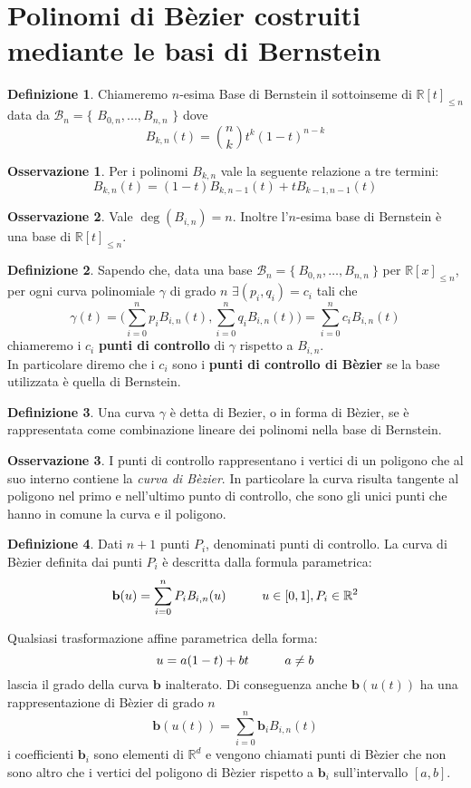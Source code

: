 \documentclass[a4paper,12pt]{report}
\newcommand\tab[1][0.5cm]{\hspace*{#1}}
\theoremstyle{definition}
\newtheorem{defin}{Definizione}[chapter]
\newtheorem{oss}{Osservazione}[chapter]
\newcommand{\numberset}{\mathbb}
\newcommand{\R}{{\numberset{R}}}
\begin{document}
\section{Polinomi di Bèzier costruiti mediante le basi di Bernstein}
\begin{defin}
	Chiameremo $n$-esima Base di Bernstein il sottoinseme di $\R[t]_{\le n}$ data da $\mathcal{{B}}_n = \{$ $\mathbb{\textit{B}}_{0,n} , ... , \mathbb{\textit{B}}_{n,n} $ $\}$ dove 
	$$B_{k,n}(t) =  \binom{n}{k} t^k (1-t)^{n-k}$$
\end{defin}
\begin{oss}
	Per i polinomi $B_{k,n}$ vale la seguente relazione a tre termini:$$B_{k,n}(t) = (1-t)B_{k,n-1}(t) + tB_{k-1,n-1}(t)$$
\end{oss}
\begin{oss}\label{Base}
	Vale $\deg(\mathbb{\textit{B}}_{i,n}) = n $. Inoltre l'$n$-esima base di Bernstein è una base di $\mathbb{R}[t]_{\leq n}$.
\end{oss}
\begin{defin}
	Sapendo che, data una base $\mathcal{B}_n=\{\ B_{0,n},\ldots,B_{n,n}\ \}$ per $\mathbb{R}[x]_{\le n}$, per ogni curva polinomiale $\gamma$ di grado $n$ $\exists (p_i,q_i) = c_i$ tali che $$\gamma(t) = \big(\sum_{i=0}^{n} p_i\mathbb{\textit{B}}_{i,n}(t) , \sum_{i=0}^{n} q_i\mathbb{\textit{B}}_{i,n}(t) \big) = \sum_{i=0}^{n} c_i\mathbb{\textit{B}}_{i,n}(t)$$chiameremo i $c_i$ \textbf{punti di controllo} di $\gamma$ rispetto a $\mathbb{\textit{B}}_{i,n}.$\\
	In particolare diremo che i $c_i$ sono i \textbf{punti di controllo di Bèzier} se la base utilizzata è quella di Bernstein.
\end{defin}
\begin{defin} Una curva $\gamma$ è detta di Bezier, o in forma di Bèzier, se è rappresentata come combinazione lineare dei polinomi nella base di Bernstein.
\end{defin}
\begin{oss}
	I punti di controllo rappresentano i vertici di un poligono che al suo interno contiene la \textit{curva di Bèzier}. In particolare la curva risulta tangente al poligono nel primo e nell'ultimo punto di controllo, che sono gli unici punti che hanno in comune la curva e il poligono.
\end{oss}
\begin{defin}
	Dati $n+1$ punti $P_i$, denominati punti di controllo. La curva di Bèzier definita dai punti $P_i$ è descritta dalla formula parametrica: $$\textbf{b}(u) = \sum_{i=0}^{n} P_i\mathbb{\textit{B}}_{i,n}(u) \tab \tab u \in [0,1] ,  P_i \in \mathbb{R}^2$$ 
\end{defin}
Qualsiasi trasformazione affine parametrica della forma: $$u = a(1-t) + bt \tab \tab a \neq b$$
lascia il grado della curva $\textbf{b}$ inalterato. Di conseguenza anche $\textbf{b}(u(t))$ ha una rappresentazione di Bèzier di grado $n$ $$\textbf{b}(u(t)) = \sum_{i=0}^{n} \textbf{b}_i\mathbb{\textit{B}}_{i,n}(t)$$ i coefficienti $\textbf{b}_i$ sono elementi di $\mathbb{R}^d$ e vengono chiamati punti di Bèzier che non sono altro che i vertici del poligono di Bèzier rispetto a $\textbf{b}_i$ sull'intervallo $[a,b]$.
\end{document}
